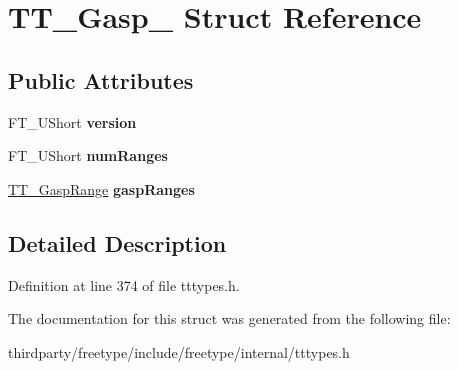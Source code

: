 \hypertarget{struct_t_t___gasp__}{}\section{T\+T\+\_\+\+Gasp\+\_\+ Struct Reference}
\label{struct_t_t___gasp__}
\subsection*{Public Attributes}
\begin{DoxyCompactItemize}
\item 
\mbox{\label{struct_t_t___gasp___a0166777999a11a32068418ed6cf0caf8}} 
F\+T\+\_\+\+U\+Short {\bfseries version}
\item 
\mbox{\label{struct_t_t___gasp___a03f6dc693ebee0fedc055ac0981ee776}} 
F\+T\+\_\+\+U\+Short {\bfseries num\+Ranges}
\item 
\mbox{\label{struct_t_t___gasp___a50240e84cfd7fc79ae1f2996ecb2a5d1}} 
\hyperlink{struct_t_t___gasp_range_rec__}{T\+T\+\_\+\+Gasp\+Range} {\bfseries gasp\+Ranges}
\end{DoxyCompactItemize}


\subsection{Detailed Description}


Definition at line 374 of file tttypes.\+h.



The documentation for this struct was generated from the following file\+:\begin{DoxyCompactItemize}
\item 
thirdparty/freetype/include/freetype/internal/tttypes.\+h\end{DoxyCompactItemize}

